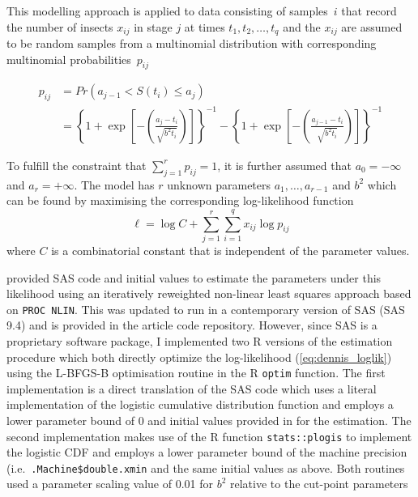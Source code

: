 This modelling approach is applied to data consisting of samples~$i$ that record the number of insects $x_{ij}$ in stage $j$ at times $t_1, t_2, \dots, t_q$ and the $x_{ij}$ are assumed to be random samples from a multinomial distribution with corresponding multinomial probabilities~$p_{ij}$

\begin{align}
p_{ij} & = Pr(a_{j-1} < S(t_i) \leq a_{j})\\
& =  \left\{ 1 + \exp\left[-\left(\frac{a_j-t_i}{\sqrt{b^2t_i}}\right)\right]\right\}^{-1} - \left\{ 1 + \exp\left[-\left(\frac{a_{j-1}-t_i}{\sqrt{b^2t_i}}\right)\right]\right\}^{-1}\label{eq:dennis_cm}
\end{align}

To fulfill the constraint that $\sum_{j=1}^r p_{ij}= 1$, it is further assumed that $a_0 = -\infty$ and $a_r = +\infty$.
The model has $r$ unknown parameters $a_1, \dots, a_{r-1}$ and $b^2$ which can be found by maximising the corresponding log-likelihood function
\begin{equation}
\mathcal{\ell} = \log C + \sum_{j=1}^r \sum_{i=1}^q x_{ij} \log p_{ij}
\label{eq:dennis_loglik}
\end{equation}
where $C$ is a combinatorial constant that is independent of the parameter values.

\citet{dennis1986stochastic} provided SAS code and initial values to estimate the parameters under this likelihood using an iteratively reweighted non-linear least squares approach based on \verb+PROC NLIN+. 
This was updated to run in a contemporary version of SAS (SAS 9.4) and is provided in the article code repository. 
However, since SAS is a proprietary software package, I implemented two R versions of the estimation procedure which both directly optimize the log-likelihood (\ref{eq:dennis_loglik}) using the L-BFGS-B optimisation routine \citep{byrd1995limited} in the R \verb+optim+ function. The first implementation is a direct translation of the SAS code which uses a literal implementation of the logistic cumulative distribution function and employs a lower parameter bound of 0 and initial values provided in \citep{dennis1986stochastic} for the estimation. The second implementation makes use of the R function \verb+stats::plogis+ to implement the logistic CDF and employs a lower parameter bound of the machine precision (i.e.\ \verb+.Machine$double.xmin+ and the same initial values as above. Both routines used a parameter scaling value of 0.01 for $b^2$ relative to the cut-point parameters

